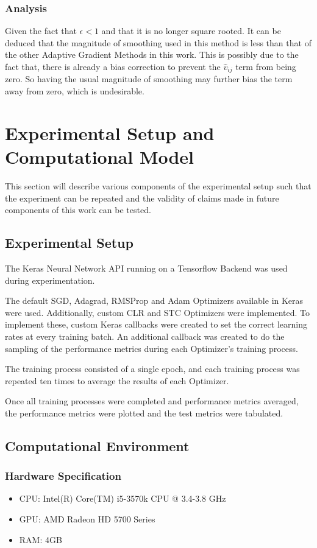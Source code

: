 \documentclass{article}
\begin{document}
\subsubsection{Analysis}
Given the fact that $\epsilon < 1$ and that it is no longer square rooted. It can be deduced that the magnitude of smoothing used in this method is less than that of the other Adaptive Gradient Methods in this work. This is possibly due to the fact that, there is already a bias correction to prevent the $\hat{v}_{ij}$ term from being zero. So having the usual magnitude of smoothing may further bias the term away from zero, which is undesirable.

\section{Experimental Setup and Computational Model}

This section will describe various components of the experimental setup such that the experiment can be repeated and the validity of claims made in future components of this work can be tested.
\subsection{Experimental Setup}

The Keras Neural Network API running on a Tensorflow Backend was used during experimentation.

The default SGD, Adagrad, RMSProp and Adam Optimizers available in Keras were used. Additionally, custom CLR and STC Optimizers were implemented. To implement these, custom Keras callbacks were created to set the correct learning rates at every training batch. An additional callback was created to do the sampling of the performance metrics during each Optimizer's training process.

The training process consisted of a single epoch, and each training process was repeated ten times to average the results of each Optimizer.

Once all training processes were completed and performance metrics averaged, the performance metrics were plotted and the test metrics were tabulated.  

\subsection{Computational Environment}
\subsubsection{Hardware Specification}
\begin{itemize}
	\item  CPU: Intel(R) Core(TM) i5-3570k CPU @ 3.4-3.8 GHz
	\item  GPU: AMD Radeon HD 5700 Series
	\item  RAM: 4GB
\end{itemize}
\end{document}
